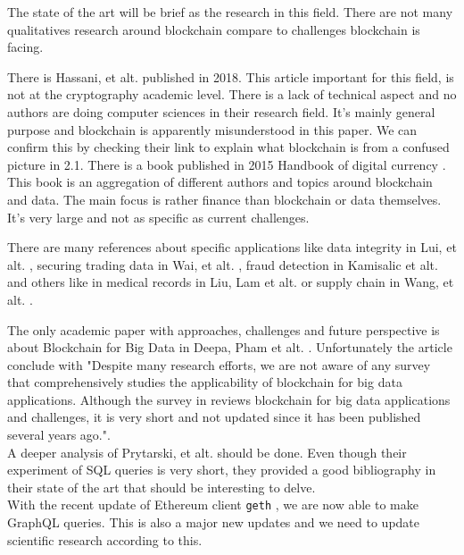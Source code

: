 \documentclass[12pt]{article}
\begin{document}
The state of the art will be brief as the research in this field. There are not many qualitatives research around blockchain compare to challenges blockchain is facing.

There is Hassani, et alt. \cite{bigdata} published in 2018. This article important for this field, is not at the cryptography academic level.  There is a lack of technical aspect and no authors are doing computer sciences in their research field. It's mainly general purpose and blockchain is apparently misunderstood in this paper. We can confirm this by checking their link to explain what blockchain is from a confused picture in 2.1.
There is a book published in 2015 Handbook of digital currency \cite{book-blockchain-data}. This book is an aggregation of different authors and topics around blockchain and data. The main focus is rather finance than blockchain or data themselves. It's very large and not as specific as current challenges.  

There are many references about specific applications like data integrity in Lui, et alt. \cite{data-integrity}, securing trading data in Wai, et alt. \cite{data-trading-secure} , fraud detection in Kamisalic et alt. \cite{fraud-detection}  and others like in medical records in Liu, Lam et alt. \cite{data-med}  or supply chain in Wang, et alt. \cite{data-supplychain}. 

The only academic paper with approaches, challenges and future perspective is about Blockchain for Big Data in Deepa, Pham et alt. \cite{survey-bigdata-blockchain}. Unfortunately the article conclude with  "Despite many research efforts, we are not aware of any survey that comprehensively studies the applicability of blockchain for big data applications. Although the survey in \cite{scalability-blockchain} reviews blockchain for big data applications and challenges, it is very short and not updated since it has been published several years ago.".\\

A deeper analysis of Prytarski, et alt. \cite{query} should be done. Even though their experiment of SQL queries is very short, they provided a good bibliography in their state of the art that should be interesting to delve.\\

With the recent update of Ethereum client \texttt{geth} \cite{geth}, we are now able to make GraphQL\cite{graphql} queries. This is also a major new updates and we need to update scientific research according to this. 
\end{document}
